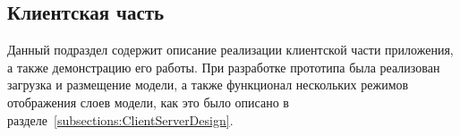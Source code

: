 ﻿\subsection{Клиентская часть}
\label{subsections:ClientImpl}

Данный подраздел содержит описание реализации клиентской части приложения,
а также демонстрацию его работы. При разработке прототипа была реализован
загрузка и размещение модели, а также функционал нескольких режимов отображения
слоев модели, как это было описано в разделе~\ref{subsections:ClientServerDesign}.




